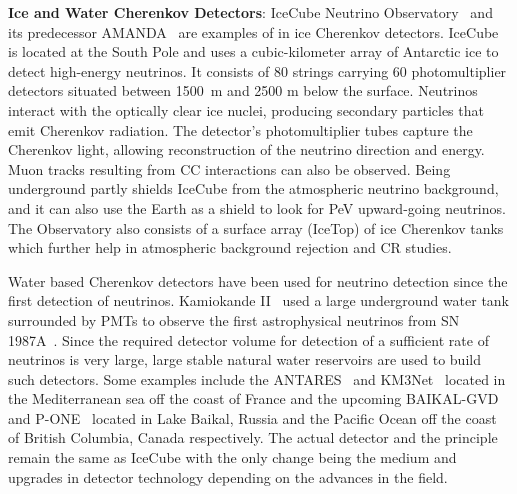 \begin{description}
  \item \textbf{Ice and Water Cherenkov Detectors}: IceCube Neutrino Observatory~\cite{Aartsen_2017} and its predecessor AMANDA~\cite{WISCHNEWSKI1999412} are examples of in ice Cherenkov detectors. IceCube is located at the South Pole and uses a cubic-kilometer array of Antarctic ice to detect high-energy neutrinos. It consists of 80 strings carrying 60 photomultiplier detectors situated between 1500 m and 2500 m below the surface. Neutrinos interact with the optically clear ice nuclei, producing secondary particles that emit Cherenkov radiation. The detector's photomultiplier tubes capture the Cherenkov light, allowing reconstruction of the neutrino direction and energy. Muon tracks resulting from CC interactions can also be observed. Being underground partly shields IceCube from the atmospheric neutrino background, and it can also use the Earth as a shield to look for PeV upward-going neutrinos. The Observatory also consists of a surface array (IceTop) of ice Cherenkov tanks which further help in atmospheric background rejection and CR studies. 
  
  Water based Cherenkov detectors have been used for neutrino detection since the first detection of neutrinos. Kamiokande II~\cite{Arisaka:1984aoa} used a large underground water tank surrounded by PMTs to observe the first astrophysical neutrinos from SN 1987A~\cite{PhysRevLett.58.1490}. Since the required detector volume for detection of a sufficient rate of neutrinos is very large, large stable natural water reservoirs are used to build such detectors. Some examples include the ANTARES~\cite{CREUSOT2013489} and KM3Net~\cite{MARGIOTTA201483} located in the Mediterranean sea off the coast of France and the upcoming BAIKAL-GVD~\cite{MALYSHKIN2023168117} and P-ONE~\cite{P-ONE:2020ljt} located in Lake Baikal, Russia and the Pacific Ocean off the coast of British Columbia, Canada respectively. The actual detector and the principle remain the same as IceCube with the only change being the medium and upgrades in detector technology depending on the advances in the field. 
  

\end{description}
